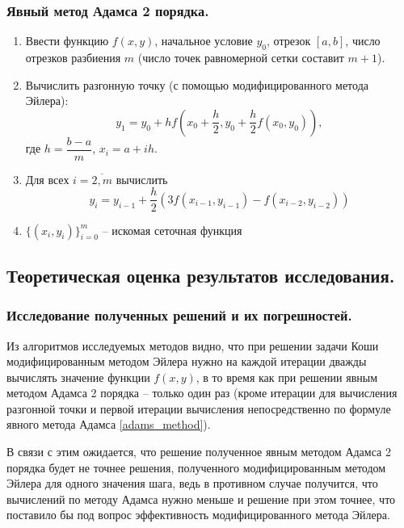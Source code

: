 \documentclass[a4paper, 12pt]{article}
\theoremstyle{mythm}
\begin{document}
	\subsubsection{Явный метод Адамса 2 порядка.}
	
	\begin{enumerate}
		\item Ввести функцию $f(x,y)$, начальное условие $y_0$, отрезок $[a,b]$, число отрезков разбиения $m$ (число точек равномерной сетки составит $m+1$).
		\item Вычислить разгонную точку (с помощью модифицированного метода Эйлера):
		\begin{equation} \label{euler_boost}
			y_1 = y_0 + hf(x_0 + \frac{h}{2}, y_0+\frac{h}{2}f(x_0,y_0)),
		\end{equation}
		где $h=\dfrac{b-a}{m}$, $x_i=a+ih$.
		\item Для всех $i=\overline{2,m}$ вычислить
		\begin{equation} \label{adams_method}
			y_i = y_{i-1} + \frac{h}{2}(3f(x_{i-1},y_{i-1})-f(x_{i-2}, y_{i-2}))
		\end{equation}
		\item $\{(x_i,y_i)\}_{i=0}^m$ -- искомая сеточная функция
	\end{enumerate}
	
	\subsection{Теоретическая оценка результатов исследования.}
	
	\subsubsection{Исследование полученных решений и их погрешностей.}
	
	Из алгоритмов исследуемых методов видно, что при решении задачи Коши модифицированным методом Эйлера нужно на каждой итерации дважды вычислять значение функции $f(x,y)$, в то время как при решении явным методом Адамса 2 порядка -- только один раз (кроме итерации для вычисления разгонной точки и первой итерации вычисления непосредственно по формуле явного метода Адамса \eqref{adams_method}).
	
	В связи с этим ожидается, что решение полученное явным методом Адамса 2 порядка будет не точнее решения, полученного модифицированным методом Эйлера для одного значения шага, ведь в противном случае получится, что вычислений по методу Адамса нужно меньше и решение при этом точнее, что поставило бы под вопрос эффективность модифицированного метода Эйлера. 
	
\end{document}
